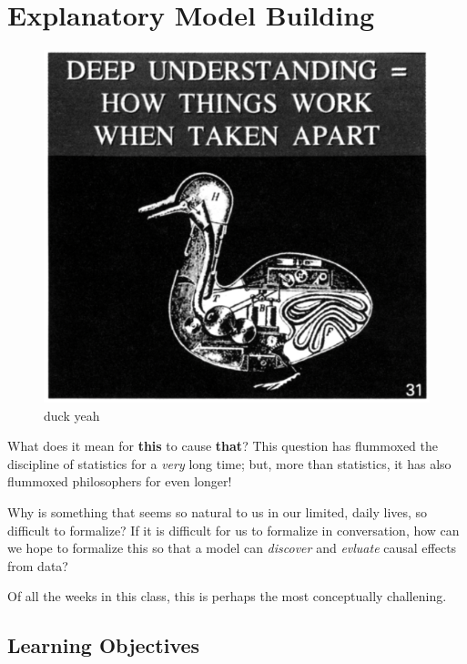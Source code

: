 \documentclass[
]{book}
\theoremstyle{definition}
\theoremstyle{definition}
\theoremstyle{definition}
\theoremstyle{definition}
\theoremstyle{remark}
\begin{document}
\hypertarget{explanatory-model-building}{%
\chapter{Explanatory Model Building}\label{explanatory-model-building}}

\begin{figure}
\centering
\includegraphics{./images/duck.png}
\caption{duck yeah}
\end{figure}

What does it mean for \textbf{this} to cause \textbf{that}? This question has flummoxed the discipline of statistics for a \emph{very} long time; but, more than statistics, it has also flummoxed philosophers for even longer!

Why is something that seems so natural to us in our limited, daily lives, so difficult to formalize? If it is difficult for us to formalize in conversation, how can we hope to formalize this so that a model can \emph{discover} and \emph{evluate} causal effects from data?

Of all the weeks in this class, this is perhaps the most conceptually challening.

\hypertarget{learning-objectives-10}{%
\section{Learning Objectives}\label{learning-objectives-10}}
\end{document}
